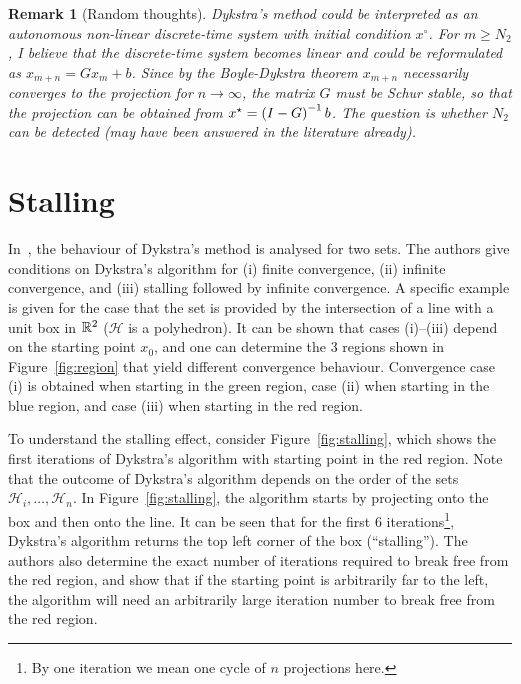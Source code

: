 \documentclass[hidelinks]{article}
\newtheorem{remark}{Remark}
\begin{document}
\begin{remark}[Random thoughts]
Dykstra's method could be interpreted as an autonomous non-linear discrete-time system with initial condition $x^\circ$. For $m\geq N_2$, I believe that the discrete-time system becomes \emph{linear} and could be reformulated as $x_{m+n} = G x_m + b$.
Since by the Boyle-Dykstra theorem $x_{m+n}$ necessarily converges to the projection for $n\rightarrow\infty$, the matrix $G$ must be Schur stable, so that the projection can be obtained from $x^\star = \left(I-G\right)^{-1} b$. The question is whether $N_2$ can be detected (may have been answered in the literature already).
\end{remark}

\section{Stalling}

In~\cite{DYKSTRASTALLING}, the behaviour of Dykstra's method is analysed for two sets. The authors give conditions on Dykstra's algorithm for (i) finite convergence, (ii) infinite convergence, and (iii) stalling followed by infinite convergence. A specific example is given for the case that the set is provided by the intersection of a line with a unit box in $\mathbb{R}^2$ ($\mathcal{H}$ is a polyhedron). It can be shown that cases (i)--(iii) depend on the starting point $x_0$, and one can determine the 3 regions shown in Figure~\ref{fig:region} that yield different convergence behaviour. Convergence case (i) is obtained when starting in the green region, case (ii) when starting in the blue region, and case (iii) when starting in the red region.

To understand the stalling effect, consider Figure~\ref{fig:stalling}, which shows the first iterations of Dykstra's algorithm with starting point in the red region. Note that the outcome of Dykstra's algorithm depends on the order of the sets $\mathcal{H}_i,\dots,\mathcal{H}_n$. In Figure~\ref{fig:stalling}, the algorithm starts by projecting onto the box and then onto the line. It can be seen that for the first 6 iterations\footnote{By one iteration we mean one cycle of $n$ projections here.}, Dykstra's algorithm returns the top left corner of the box (``stalling''). The authors also determine the exact number of iterations required to break free from the red region, and show that if the starting point is arbitrarily far to the left, the algorithm will need an arbitrarily large iteration number to break free from the red region.
\end{document}
